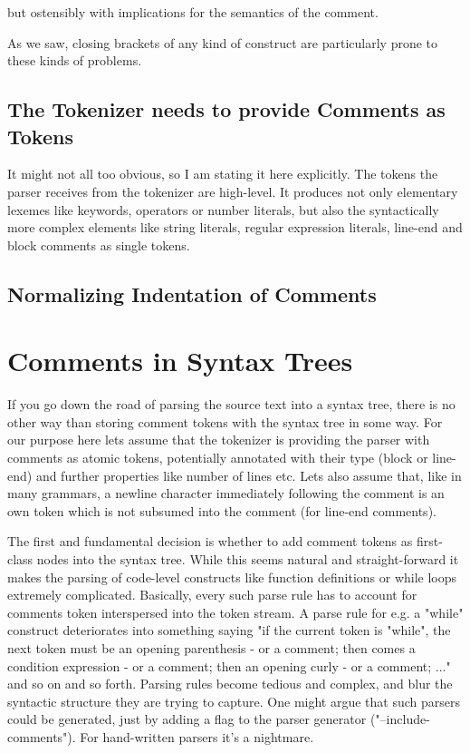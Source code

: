 \documentclass[11pt,a4paper]{article}
\begin{document}
but ostensibly with implications for the semantics of the comment.

As we saw, closing brackets of any kind of construct are
particularly prone to these kinds of problems.


\subsection{The Tokenizer needs to provide Comments as Tokens}

It might not all too obvious, so I am stating it here explicitly. The tokens the
parser receives from the tokenizer are high-level. It produces not only
elementary lexemes like keywords, operators or number literals, but also the
syntactically more complex elements like string literals, regular expression
literals, line-end and block comments as single tokens.


\subsection{Normalizing Indentation of Comments}


\section{Comments in Syntax Trees}

If you go down the road of parsing the source text into a syntax tree, there is
no other way than storing comment tokens with the syntax tree in some way. For
our purpose here lets assume that the tokenizer is providing the parser with
comments as atomic tokens, potentially annotated with their type (block or
line-end) and further properties like number of lines etc. Lets also assume
that, like in many grammars, a newline character immediately following the
comment is an own token which is not subsumed into the comment (for line-end
comments).

The first and fundamental decision is whether to add comment tokens as
first-class nodes into the syntax tree. While this seems natural and
straight-forward it makes the parsing of code-level constructs like function
definitions or while loops extremely complicated. Basically, every such parse
rule has to account for comments token interspersed into the token stream. A
parse rule for e.g. a "while" construct deteriorates into something saying "if
the current token is "while", the next token must be an opening parenthesis - or
a comment; then comes a condition expression - or a comment; then an opening
curly - or a comment; ..." and so on and so forth. Parsing rules become tedious
and complex, and blur the syntactic structure they are trying to capture. One
might argue that such parsers could be generated, just by adding a flag to the
parser generator ("--include-comments"). For hand-written parsers it's a
nightmare.
\end{document}
